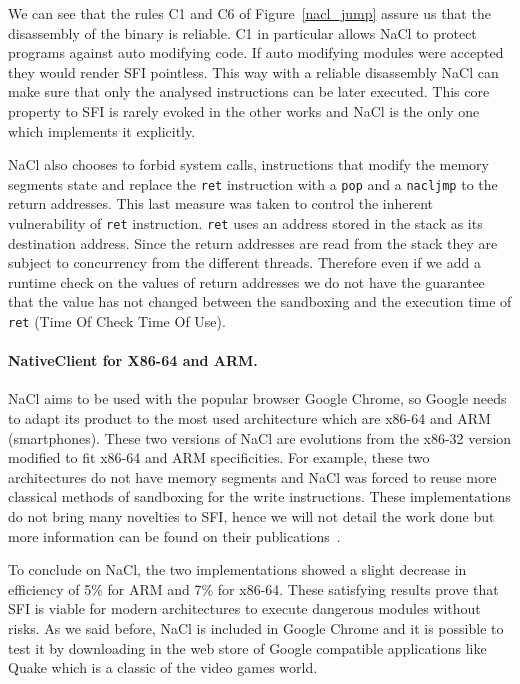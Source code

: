 \documentclass[11pt]{sdm}
\begin{document}
We can see that the rules C1 and C6 of Figure~\ref{nacl_jump} assure us that the disassembly of the binary is reliable. C1 in particular allows NaCl to protect programs against auto modifying code. If auto modifying modules were accepted they would render SFI pointless. This way with a reliable disassembly NaCl can make sure that only the analysed instructions can be later executed. This core property to SFI is rarely evoked in the other works and NaCl is the only one which implements it explicitly.

NaCl also chooses to forbid system calls, instructions that modify the memory segments state and replace the \texttt{ret} instruction with a \texttt{pop} and a \texttt{nacljmp} to the return addresses.
This last measure was taken to control the inherent vulnerability of \texttt{ret} instruction. \texttt{ret} uses an address stored in the stack as its destination address. Since the return addresses are read from the stack they are subject to concurrency from the different threads. Therefore even if we add a runtime check on the values of return addresses we do not have the guarantee that the value has not changed between the sandboxing and the execution time of \texttt{ret} (Time Of Check Time Of Use).

\paragraph{NativeClient for X86-64 and ARM.}
\label{par:NativeClient for X86-64 and ARM.}
NaCl aims to be used with the popular browser Google Chrome, so Google needs to adapt its product to the most used architecture which are x86-64 and ARM (smartphones). These two versions of NaCl are evolutions from the x86-32 version modified to fit x86-64 and ARM specificities. For example, these two architectures do not have memory segments and NaCl was forced to reuse more classical methods of sandboxing for the write instructions. These implementations do not bring many novelties to SFI, hence we will not detail the work done but more information can be found on their publications~\cite{Sehr:2010:ASF:1929820.1929822}.

To conclude on NaCl, the two implementations showed a slight decrease in efficiency of 5\% for ARM and 7\% for x86-64. These satisfying results prove that SFI is viable for modern architectures to execute dangerous modules without risks. As we said before, NaCl is included in Google Chrome and it is possible to test it by downloading in the web store of Google compatible applications like Quake which is a classic of the video games world.
\end{document}
